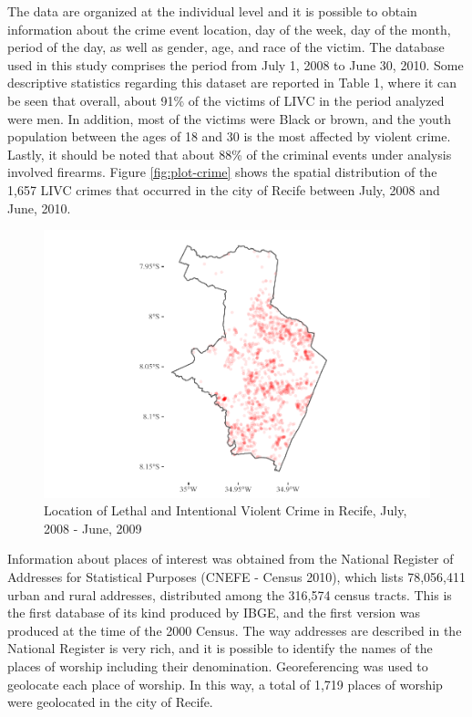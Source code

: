 \documentclass[smallextended]{svjour3}       %
\begin{document}
The data are organized at the individual level and it is possible to
obtain information about the crime event location, day of the week, day
of the month, period of the day, as well as gender, age, and race of the
victim. The database used in this study comprises the period from July
1, 2008 to June 30, 2010. Some descriptive statistics regarding this
dataset are reported in Table 1, where it can be seen that overall,
about 91\% of the victims of LIVC in the period analyzed were men. In
addition, most of the victims were Black or brown, and the youth
population between the ages of 18 and 30 is the most affected by violent
crime. Lastly, it should be noted that about 88\% of the criminal events
under analysis involved firearms. Figure \ref{fig:plot-crime} shows the
spatial distribution of the 1,657 LIVC crimes that occurred in the city
of Recife between July, 2008 and June, 2010.

\begin{figure}

\includegraphics{Moral_Communities_and_Crime_files/figure-latex/fig-plot-crime-1} \hfill{}

\caption{\label{fig:plot-crime}Location of Lethal and Intentional Violent Crime in Recife, July, 2008 - June, 2009}\label{fig:fig-plot-crime}
\end{figure}

Information about places of interest was obtained from the National
Register of Addresses for Statistical Purposes (CNEFE - Census 2010),
which lists 78,056,411 urban and rural addresses, distributed among the
316,574 census tracts. This is the first database of its kind produced
by IBGE, and the first version was produced at the time of the 2000
Census. The way addresses are described in the National Register is very
rich, and it is possible to identify the names of the places of worship
including their denomination. Georeferencing was used to geolocate each
place of worship. In this way, a total of 1,719 places of worship were
geolocated in the city of Recife.
\end{document}
